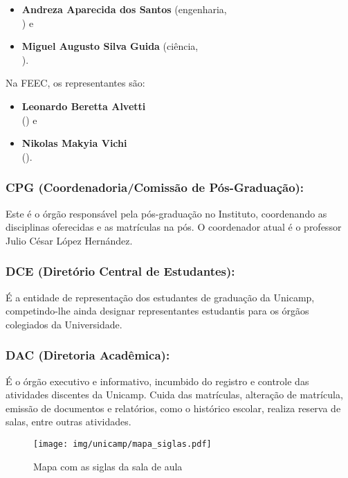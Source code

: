 \begin{itemize}[noitemsep]
\item \textbf{Andreza Aparecida dos Santos} (engenharia,
  \\ ) e
\item \textbf{Miguel Augusto Silva Guida} (ciência,
  \\ ).
\end{itemize}

Na FEEC, os representantes são:

\begin{itemize}[noitemsep]
\item \textbf{Leonardo Beretta Alvetti}
  \\ () e
\item \textbf{Nikolas Makyia Vichi}
  \\ ().
\end{itemize}

\subsubsection{CPG (Coordenadoria/Comissão de Pós-Graduação):} Este é o órgão
responsável pela pós-graduação no Instituto, coordenando as disciplinas
oferecidas e as matrículas na pós. O coordenador atual é o professor Julio
César López Hernández.

\subsubsection{DCE (Diretório Central de Estudantes):} É a entidade de
representação dos estudantes de graduação da Unicamp, competindo-lhe ainda
designar representantes estudantis para os órgãos colegiados da Universidade.

\subsubsection{DAC (Diretoria Acadêmica):} É o órgão executivo e informativo,
incumbido do registro e controle das atividades discentes da Unicamp. Cuida das
matrículas, alteração de matrícula, emissão de documentos e relatórios, como o
histórico escolar, realiza reserva de salas, entre outras atividades.

\begin{figure*}[hb!]  \centering
  \texttt{[image: img/unicamp/mapa\_siglas.pdf]}
  \caption{Mapa com as siglas da sala de aula}
  \label{fig:mapa_siglas}
\end{figure*}

